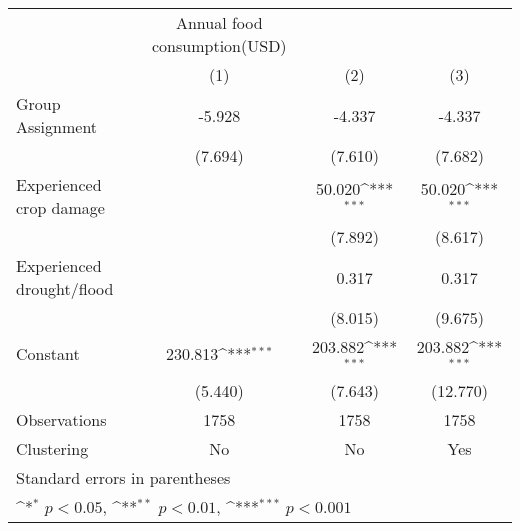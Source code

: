 {
\def\sym#1{\ifmmode^{#1}\else\(^{#1}\)\fi}
\begin{tabular}{l*{3}{c}}
\hline\hline
                    &Annual food consumption(USD)                                     \\
                    &\multicolumn{1}{c}{(1)}         &\multicolumn{1}{c}{(2)}         &\multicolumn{1}{c}{(3)}         \\
\hline
Group Assignment    &      -5.928         &      -4.337         &      -4.337         \\
                    &     (7.694)         &     (7.610)         &     (7.682)         \\
[1em]
Experienced crop damage&                     &      50.020\sym{***}&      50.020\sym{***}\\
                    &                     &     (7.892)         &     (8.617)         \\
[1em]
Experienced drought/flood&                     &       0.317         &       0.317         \\
                    &                     &     (8.015)         &     (9.675)         \\
[1em]
Constant            &     230.813\sym{***}&     203.882\sym{***}&     203.882\sym{***}\\
                    &     (5.440)         &     (7.643)         &    (12.770)         \\
\hline
Observations        &        1758         &        1758         &        1758         \\
Clustering          &          No         &          No         &         Yes         \\
\hline\hline
\multicolumn{4}{l}{\footnotesize Standard errors in parentheses}\\
\multicolumn{4}{l}{\footnotesize \sym{*} \(p<0.05\), \sym{**} \(p<0.01\), \sym{***} \(p<0.001\)}\\
\end{tabular}
}
